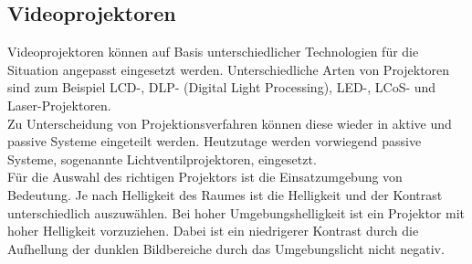 \subsection{Videoprojektoren}
Videoprojektoren können auf Basis unterschiedlicher Technologien für die Situation angepasst eingesetzt werden. Unterschiedliche Arten von Projektoren sind zum Beispiel LCD-, DLP- (Digital Light Processing), LED-, LCoS- und Laser-Projektoren. \\
Zu Unterscheidung von Projektionsverfahren können diese wieder in aktive und passive Systeme eingeteilt werden. Heutzutage werden vorwiegend passive Systeme, sogenannte Lichtventilprojektoren, eingesetzt. \cite[Vgl. Seite 551]{Schmidt.2021} \\
Für die Auswahl des richtigen Projektors ist die Einsatzumgebung von Bedeutung. Je nach Helligkeit des Raumes ist die Helligkeit und der Kontrast unterschiedlich auszuwählen. Bei hoher Umgebungshelligkeit ist ein Projektor mit hoher Helligkeit vorzuziehen. Dabei ist ein niedrigerer Kontrast durch die Aufhellung der dunklen Bildbereiche durch das Umgebungslicht nicht negativ. \cite[Vgl. Seite 562]{Schmidt.2021}
